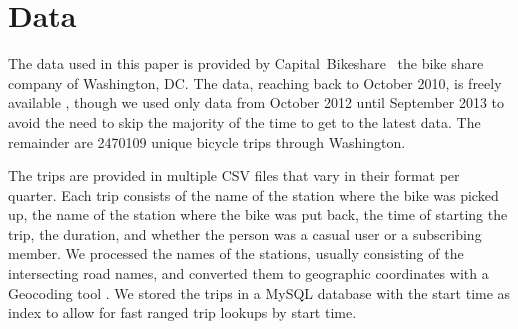 \section{Data}
\label{sec:data}
The data used in this paper is provided by Capital~Bikeshare~\cite{wash}
the bike share company of Washington, DC. The data, reaching back
to October 2010, is freely available \cite{data}, though we used
only data from October 2012 until September 2013 to avoid the need
to skip the majority of the time to get to the latest data.
The remainder are 2470109 unique bicycle trips through Washington.

The trips are provided in multiple CSV files that vary in their format
per quarter.
Each trip consists of the name of the station where the bike was
picked up, the name of the station where the bike was put back, the time of
starting the trip, the duration, and whether the person was a
casual user or a subscribing member.
We processed the names of the stations,
usually consisting of the intersecting road names,
and converted them to geographic coordinates with a Geocoding
tool \cite{convert}.
We stored the trips in a MySQL database with the start time
as index to allow for fast ranged trip lookups by start time.

\vspace*{3em}
